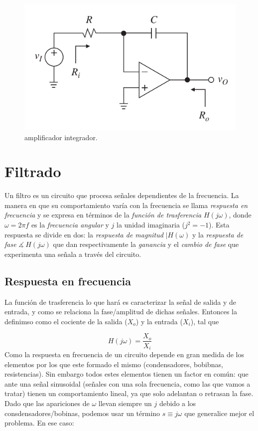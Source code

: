 \documentclass[12pt,a4paper]{article}
\numberwithin{equation}{section}
\numberwithin{figure}{section}
\begin{document}
\begin{figure}[h!] \centering
\includegraphics[scale=0.3]{1.3.7-Integrador.png}
\caption{amplificador integrador.}
\label{Fig:1.3.7-Amplificador-Integrador}
\end{figure} 


\newpage

\section{Filtrado}

Un filtro es un circuito que procesa señales dependientes de la frecuencia. La manera en que su comportamiento varía con la frecuencia se llama \textit{respuesta en frecuencia} y se expresa en términos de la \textit{función de trasferencia} $H(j\omega)$, donde $\omega = 2 \pi f$ es la \textit{frecuencia angular} y $j$ la unidad imaginaria ($j^2 = -1$). Esta respuesta se divide en dos: la \textit{respuesta de magnitud} $|H(\omega)$ y la \textit{respuesta de fase} $\measuredangle \ H(j \omega)$ que dan respectivamente la \textit{ganancia} y el \textit{cambio de fase} que experimenta una señala a través del circuito.

\subsection{Respuesta en frecuencia}

La función de trasferencia lo que hará es caracterizar la señal de salida y de entrada, y como se relaciona la fase/amplitud de dichas señales. Entonces la definimso como el cociente de la salida ($X_o$) y la entrada ($X_i$), tal que

\begin{equation}
H(j \omega) = \dfrac{X_o}{X_i}
\end{equation}
Como la respuesta en frecuencia de un circuito depende en gran medida de los elementos por los que este formado el mismo (condensadores,  bobibnas, resistencias). Sin embargo todos estes elementos tienen un factor en común: que ante una señal sinusoidal (señales con una sola frecuencia, como las que vamos a tratar) tienen un comportamiento lineal, ya que solo adelantan o retrasan la fase. Dado que las apariciones de $\omega$ llevan siempre un $j$ debido a los consdensadores/bobinas, podemos usar un término $s \equiv j \omega$ que generalice mejor el problema. En ese caso:
\end{document}
